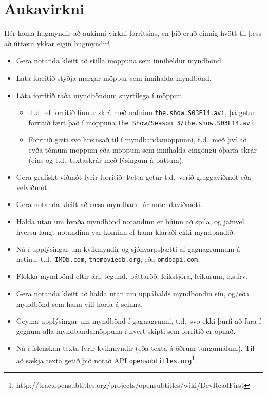 \documentclass{article}
\begin{document}
\section*{Aukavirkni}
Hér koma hugmyndir að aukinni virkni forritsins, en þið eruð einnig hvött til
þess að útfæra ykkar eigin hugmyndir!
\begin{itemize}
    \item Gera notanda kleift að stilla möppuna sem inniheldur myndbönd.
    \item Láta forritið styðja margar möppur sem innihalda myndbönd.
    \item Láta forritið raða myndböndum snyrtilega í möppur.
        \begin{itemize}
            \item T.d.\ ef forritið finnur skrá með nafninu
                \texttt{the.show.S03E14.avi}, þá getur forritið fært það í
                möppuna \texttt{The Show/Season 3/the.show.S03E14.avi}
            \item Forritið gæti svo hreinsað til í myndbandamöppunni, t.d.\ með
                því að eyða tómum möppum eða möppum sem innihalda eingöngu
                óþarfa skrár (eins og t.d.\ textaskrár með lýsingum á þáttum).
        \end{itemize}
    \item Gera grafískt viðmót fyrir forritið. Þetta getur t.d.\ verið gluggaviðmót eða vefviðmót.
    \item Gera notanda kleift að ræsa myndband úr notendaviðmóti.
    \item Halda utan um hvaða myndbönd notandinn er búinn að spila, og jafnvel
        hversu langt notandinn var kominn ef hann kláraði ekki myndbandið.
    \item Ná í upplýsingar um kvikmyndir og sjónvarpsþætti af gagnagrunnum á
        netinu, t.d.\ \texttt{IMDb.com}, \texttt{themoviedb.org}, eða \texttt{omdbapi.com}.
    \item Flokka myndbönd eftir ári, tegund, þáttaröð, leikstjóra, leikurum, o.s.frv.
    \item Gera notanda kleift að halda utan um uppáhalds myndböndin sín, og/eða
        myndbönd sem hann vill horfa á seinna.
    \item Geyma upplýsingar um myndbönd í gagnagrunni, t.d.\ svo ekki þurfi að
        fara í gegnum alla myndbandamöppuna í hvert skipti sem forritið er
        opnað.
    \item Ná í íslenskan texta fyrir kvikmyndir (eða texta á öðrum tungumálum).
        Til að sækja texta getið þið notað API
        \texttt{opensubtitles.org}\footnote{http://trac.opensubtitles.org/projects/opensubtitles/wiki/DevReadFirst}.
\end{itemize}
\end{document}
